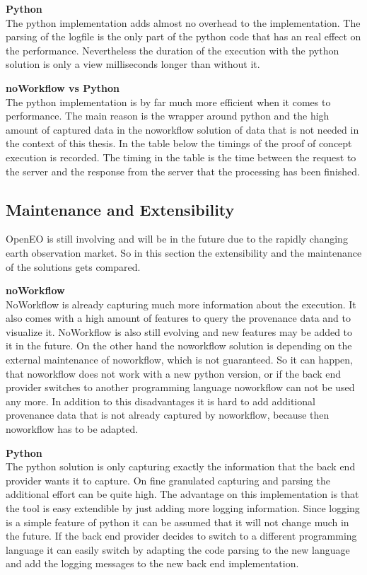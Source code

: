 \documentclass[draft,final]{vutinfth} %
\begin{document}
\textbf{Python} \\
The python implementation adds almost no overhead to the implementation. The parsing of the logfile is the only part of the python code that has an real effect on the performance. Nevertheless the duration of the execution with the python solution is only a view milliseconds longer than without it.  

\textbf{noWorkflow vs Python} \\
The python implementation is by far much more efficient when it comes to performance. The main reason is the wrapper around python and the high amount of captured data in the noworkflow solution of data that is not needed in the context of this thesis. In the table below the timings of the proof of concept execution is recorded. The timing in the table is the time between the request to the server and the response from the server that the processing has been finished. 


\subsection{Maintenance and Extensibility}\label{NvsP:Maintenance and Extensibility}
OpenEO is still involving and will be in the future due to the rapidly changing earth observation market. So in this section the extensibility and the maintenance of the solutions gets compared. 

\textbf{noWorkflow} \\
NoWorkflow is already capturing much more information about the execution. It also comes with a high amount of features to query the provenance data and to visualize it. NoWorkflow is also still evolving and new features may be added to it in the future. On the other hand the noworkflow solution is depending on the external maintenance of noworkflow, which is not guaranteed. So it can happen, that noworkflow does not work with a new python version, or if the back end provider switches to another programming language noworkflow can not be used any more. In addition to this disadvantages it is hard to add additional provenance data that is not already captured by noworkflow, because then noworkflow has to be adapted.

\textbf{Python} \\
The python solution is only capturing exactly the information that the back end provider wants it to capture. On fine granulated capturing and parsing the additional effort can be quite high. The advantage on this implementation is that the tool is easy extendible by just adding more logging information. Since logging is a simple feature of python it can be assumed that it will not change much in the future. If the back end provider decides to switch to a different programming language it can easily switch by adapting the code parsing to the new language and add the logging messages to the new back end implementation. 
\end{document}
